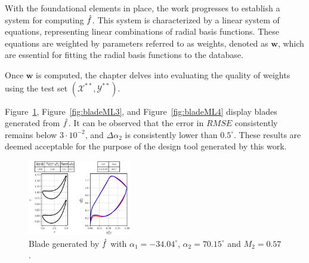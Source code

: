 \documentclass[11pt,a4paper,twocolumn]{article}
\newcommand\widthPCA{0.4}
\begin{document}
With the foundational elements in place, the work progresses to establish a system for computing $\hat{\mathnormal{f}}$. This system is characterized by a linear system of equations, representing linear combinations of radial basis functions. These equations are weighted by parameters referred to as weights, denoted as $\boldsymbol{w}$, which are essential for fitting the radial basis functions to the database.

Once $\boldsymbol{w}$ is computed, the chapter delves into evaluating the quality of weights using the test set $(\mathcal{X}^{**}, \mathcal{Y}^{**})$.

Figure~\ref{fig:bladeML1}, Figure~\ref{fig:bladeML3}, and Figure~\ref{fig:bladeML4} display blades generated from $\hat{\mathnormal{f}}$. It can be observed that the error in $RMSE$ consistently remains below $3 \cdot 10^{-2}$, and $\Delta \alpha_2$ is consistently lower than $0.5^{\circ}$. These results are deemed acceptable for the purpose of the design tool generated by this work.

\begin{figure}[!h]
    \centering 
    \includegraphics[width=\widthPCA\textwidth]{./images/blade--3404-7015-57.eps}
    \caption{Blade generated by $\hat{\mathnormal{f}}$ with $\alpha_1 = -34.04^{\circ}$, $\alpha_2 = 70.15^{\circ}$ and $M_2 = 0.57$.}
    \label{fig:bladeML1}
\end{figure}
\end{document}
